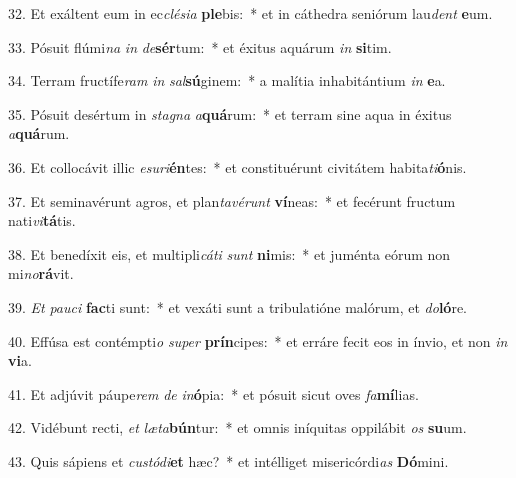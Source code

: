 32. Et exáltent eum in ec\textit{clé}\textit{si}\textit{a} \textbf{ple}bis:~*  et in cáthedra seniórum lau\textit{dent} \textbf{e}um.\

33. Pósuit flúmi\textit{na} \textit{in} \textit{de}\textbf{sér}tum:~*  et éxitus aquárum \textit{in} \textbf{si}tim.\

34. Terram fructífe\textit{ram} \textit{in} \textit{sal}\textbf{sú}ginem:~*  a malítia inhabitántium \textit{in} \textbf{e}a.\

35. Pósuit desértum in \textit{sta}\textit{gna} \textit{a}\textbf{quá}rum:~*  et terram sine aqua in éxitus \textit{a}\textbf{quá}rum.\

36. Et collocávit illic \textit{e}\textit{su}\textit{ri}\textbf{én}tes:~*  et constituérunt civitátem habita\textit{ti}\textbf{ó}nis.\

37. Et seminavérunt agros, et plan\textit{ta}\textit{vé}\textit{runt} \textbf{ví}neas:~*  et fecérunt fructum nati\textit{vi}\textbf{tá}tis.\

38. Et benedíxit eis, et multipli\textit{cá}\textit{ti} \textit{sunt} \textbf{ni}mis:~*  et juménta eórum non mi\textit{no}\textbf{rá}vit.\

39. \textit{Et} \textit{pau}\textit{ci} \textbf{fac}ti sunt:~*  et vexáti sunt a tribulatióne malórum, et \textit{do}\textbf{ló}re.\

40. Effúsa est contémpti\textit{o} \textit{su}\textit{per} \textbf{prín}cipes:~*  et erráre fecit eos in ínvio, et non \textit{in} \textbf{vi}a.\

41. Et adjúvit páupe\textit{rem} \textit{de} \textit{in}\textbf{ó}pia:~*  et pósuit sicut oves \textit{fa}\textbf{mí}lias.\

42. Vidébunt recti, \textit{et} \textit{læ}\textit{ta}\textbf{bún}tur:~*  et omnis iníquitas oppilábit \textit{os} \textbf{su}um.\

43. Quis sápiens et \textit{cus}\textit{tó}\textit{di}\textbf{et} hæc?~*  et intélliget misericórdi\textit{as} \textbf{Dó}mini.\

